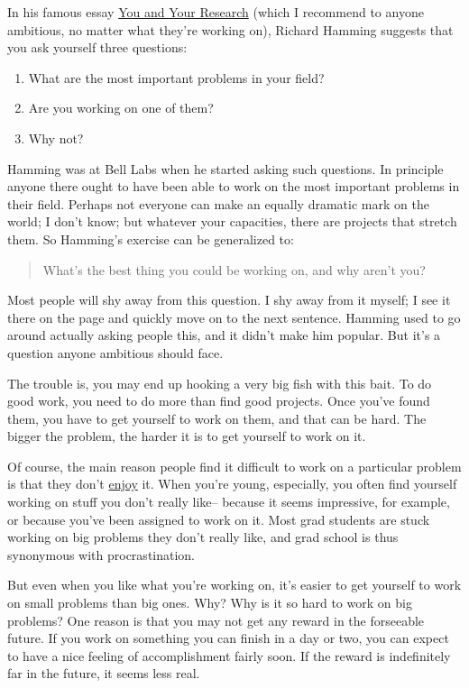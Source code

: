 \documentclass[12pt]{book}
\begin{document}
In his famous essay \href{hamming.html}{You and Your Research} (which I
recommend to anyone ambitious, no matter what they're working on),
Richard Hamming suggests that you ask yourself three questions:

\begin{enumerate}
\def\labelenumi{\arabic{enumi}.}
\item
  What are the most important problems in your field?
\item
  Are you working on one of them?
\item
  Why not?
\end{enumerate}

Hamming was at Bell Labs when he started asking such questions. In
principle anyone there ought to have been able to work on the most
important problems in their field. Perhaps not everyone can make an
equally dramatic mark on the world; I don't know; but whatever your
capacities, there are projects that stretch them. So Hamming's exercise
can be generalized to:

\begin{quote}
What's the best thing you could be working on, and why aren't you?
\end{quote}

Most people will shy away from this question. I shy away from it myself;
I see it there on the page and quickly move on to the next sentence.
Hamming used to go around actually asking people this, and it didn't
make him popular. But it's a question anyone ambitious should face.

The trouble is, you may end up hooking a very big fish with this bait.
To do good work, you need to do more than find good projects. Once
you've found them, you have to get yourself to work on them, and that
can be hard. The bigger the problem, the harder it is to get yourself to
work on it.

Of course, the main reason people find it difficult to work on a
particular problem is that they don't \href{hs.html}{enjoy} it. When
you're young, especially, you often find yourself working on stuff you
don't really like-- because it seems impressive, for example, or because
you've been assigned to work on it. Most grad students are stuck working
on big problems they don't really like, and grad school is thus
synonymous with procrastination.

But even when you like what you're working on, it's easier to get
yourself to work on small problems than big ones. Why? Why is it so hard
to work on big problems? One reason is that you may not get any reward
in the forseeable future. If you work on something you can finish in a
day or two, you can expect to have a nice feeling of accomplishment
fairly soon. If the reward is indefinitely far in the future, it seems
less real.
\end{document}
